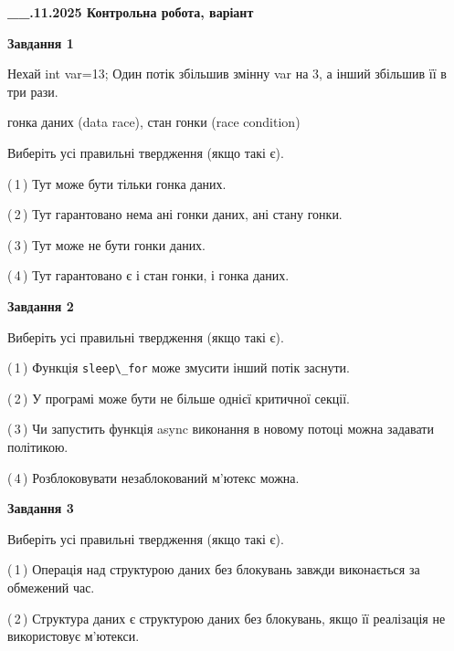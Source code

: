 \documentclass[12pt, ukrainian]{article}
\def\code#1{\Verb!#1!}
\begin{document}
\begin {large}

\textbf{\_\_.11.2025 Контрольна робота, варіант  }\par


{

\begin{center}
\textbf{Завдання 1}
\end{center}
Нехай int var=13; Один потік збільшив змінну var на 3, а інший збільшив її в три рази.

гонка даних (data race), стан гонки (race condition)

Виберіть усі правильні твердження (якщо такі є).\par
\vspace{2mm}
(\,1\,) Тут може бути тільки гонка даних.%

(\,2\,) Тут гарантовано нема ані гонки даних, ані стану гонки.%

(\,3\,) Тут може не бути гонки даних.%

(\,4\,) Тут гарантовано є і стан гонки, і гонка даних.%



\begin{center}
\textbf{Завдання 2}
\end{center}
Виберіть усі правильні твердження (якщо такі є).\par
\vspace{2mm}

(\,1\,) Функція \code{sleep\_for} може змусити інший потік заснути.%

(\,2\,) У програмі може бути не більше однієї критичної секції.%

(\,3\,) Чи запустить функція  async виконання в новому потоці можна задавати політикою.%

(\,4\,) Розблоковувати незаблокований м’ютекс можна.%



\begin{center}
\textbf{Завдання 3}
\end{center}
Виберіть усі правильні твердження (якщо такі є).\par
\vspace{2mm}

(\,1\,) Операція над структурою даних без блокувань завжди виконається за обмежений час.%

(\,2\,) Структура даних є структурою даних без блокувань, якщо її реалізація не використовує м’ютекси.%

}
\end{large}
\end{document}
